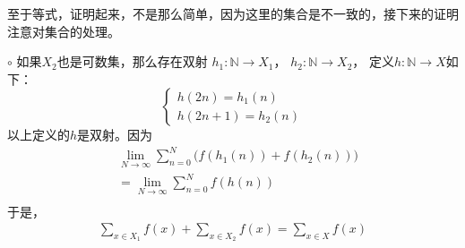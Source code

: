 \documentclass{article}
\begin{document}
\begin{itemize}
        至于等式，证明起来，不是那么简单，因为这里的集合是不一致的，接下来的证明注意对集合的处理。

        $\circ$ 如果$X_2$也是可数集，那么存在双射
        $h_1: \mathbb{N} \rightarrow X_1$，
        $h_2: \mathbb{N} \rightarrow X_2$，
        定义$h: \mathbb{N} \rightarrow X$如下：
        \begin{equation}
          \begin{cases*}
            h(2n) = h_1(n) \\
            h(2n+1) = h_2(n)
          \end{cases*}
        \end{equation}
        以上定义的$h$是双射。因为
        \begin{align*}
           & \lim \limits_{N \rightarrow \infty} \sum \limits_{n=0}^N \big(f(h_1(n)) + f(h_2(n))\big) \\
           & = \lim \limits_{N \rightarrow \infty} \sum \limits_{n=0}^N  f(h(n))                      \\
        \end{align*}
        于是，
        \begin{align*}
          \sum \limits_{x \in X_1} f(x) + \sum \limits_{x \in X_2} f(x) = \sum \limits_{x \in X} f(x)
        \end{align*}


\end{itemize}
\end{document}
